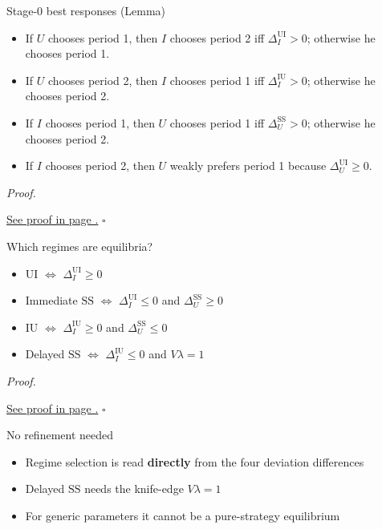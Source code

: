 \documentclass[10pt]{beamer}
\newcommand{\rSS}{\mathrm{SS}}
\newcommand{\rUI}{\mathrm{UI}}
\newcommand{\rIU}{\mathrm{IU}}
\renewenvironment{proof}{%
  \par\smallskip\noindent\textit{Proof.}\hspace{0.6em}\ignorespaces
}{%
  \unskip\nobreak\hfill$\square$\par\smallskip
}
\begin{document}
\begin{frame}{Stage-0 best responses (Lemma)}
  \begin{lemma}
    \begin{itemize}
      \item If $U$ chooses period 1, then $I$ chooses period 2 iff
            $\Delta_I^{\rUI} > 0$; otherwise he chooses period 1.
      \item If $U$ chooses period 2, then $I$ chooses period 1 iff
            $\Delta_I^{\rIU} > 0$; otherwise he chooses period 2.
      \item If $I$ chooses period 1, then $U$ chooses period 1 iff
            $\Delta_U^{\rSS} > 0$; otherwise he chooses period 2.
      \item If $I$ chooses period 2, then $U$ weakly prefers period 1
            because $\Delta_U^{\rUI} \ge 0$.
    \end{itemize}
  \end{lemma}

  \begin{proof}
    \hyperref[prf:br]{See proof in page \pageref{prf:br}.}
  \end{proof}
\end{frame}

\begin{frame}{Which regimes are equilibria?}
  \begin{theorem}
    \begin{itemize}
      \item $\rUI$ \;$\Leftrightarrow$\; $\Delta_I^{\rUI} \ge 0$
      \item Immediate $\rSS$ \;$\Leftrightarrow$\;
            $\Delta_I^{\rUI} \le 0$ and $\Delta_U^{\rSS} \ge 0$
      \item $\rIU$ \;$\Leftrightarrow$\;
            $\Delta_I^{\rIU} \ge 0$ and $\Delta_U^{\rSS} \le 0$
      \item Delayed $\rSS$ \;$\Leftrightarrow$\;
            $\Delta_I^{\rIU} \le 0$ and $V\lambda = 1$
    \end{itemize}
  \end{theorem}

  \begin{proof}
    \hyperref[prf:timing]{See proof in page \pageref{prf:timing}.}
  \end{proof}
\end{frame}

\begin{frame}{No refinement needed}
  \begin{itemize}
    \item Regime selection is read \textbf{directly} from the four
          deviation differences
    \item Delayed $\rSS$ needs the knife-edge $V\lambda = 1$
    \item For generic parameters it cannot be a pure-strategy
          equilibrium
  \end{itemize}
\end{frame}
\end{document}
